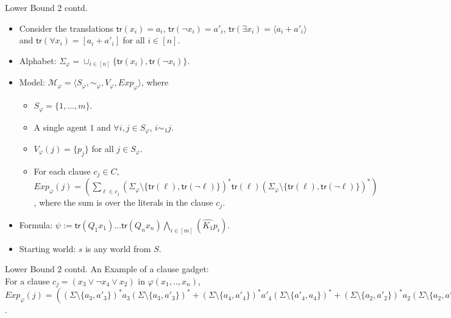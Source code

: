 \documentclass{beamer}
\newcommand\ldiaarg[1]{\langle#1\rangle}
\newcommand{\M}{\mathcal{M}}
\newcommand{\tr}{\mathsf{tr}}
\begin{document}
\begin{frame}{Lower Bound 2 contd.}
    \begin{itemize}
        \item<1-> Consider the translations $\tr(x_i) = a_i$, $\tr(\neg{x_i}) = a'_i$, $\tr(\exists x_i) = \ldiaarg{a_i + a'_i}$ and $\tr(\forall x_i) = [a_i + a'_i]$ for all $i\in [n]$.
        
        \item<2->  Alphabet: $\Sigma_\varphi = \cup_{i\in [n]}\{\tr(x_i), \tr(\neg{ x_i})\}$.
        \item<3-> Model: $\M_\varphi = \langle S_\varphi,\sim_\varphi,V_\varphi,Exp_\varphi \rangle$, where
        \begin{itemize}
            \item<4-> $S_\varphi = \{1,\dots, m \}$.
            \item<5-> A single agent $1$ and $\forall i, j\in S_{\varphi}$, $i\sim_1 j$. %
            \item<6-> $V_\varphi(j) = \{p_j\}$ for all $j\in S_{\varphi}$. %
            \item<7-> For each clause $c_j\in C$, $Exp_\varphi(j) = (\sum_{\ell\in c_j}(\Sigma_{\varphi}\setminus\{\tr(\ell), \tr(\neg{\ell})\})^*\tr(\ell)(\Sigma_{\varphi}\setminus\{\tr(\ell), \tr(\neg{\ell})\})^*)$, where the sum is over the literals in the clause $c_j$. 
            
        \end{itemize}
        \item<8-> Formula: $\psi := \tr(Q_1x_1)\dots \tr(Q_nx_n)\bigwedge_{i\in [m]}(\hat{K_1}p_i)$.
        \item<9-> Starting world: $s$ is any world from $S$.
    \end{itemize}
\end{frame}

\begin{frame}{Lower Bound 2 contd.}
    An Example of a clause gadget:\\
    For a clause $c_j = (x_3\vee \neg{x_4}\vee x_2)$ in $\varphi(x_1,..,x_n)$, $Exp_\varphi(j) = ((\Sigma\setminus\{a_3, a'_3\})^*a_3(\Sigma\setminus\{a_3,a'_3\})^* + (\Sigma\setminus\{a_4, a'_4\})^*a'_4(\Sigma\setminus\{a'_4, a_4\})^* + (\Sigma\setminus\{a_2,a'_2\})^*a_2(\Sigma\setminus\{a_2, a'_2\})^*)$.
\end{frame}
\end{document}
